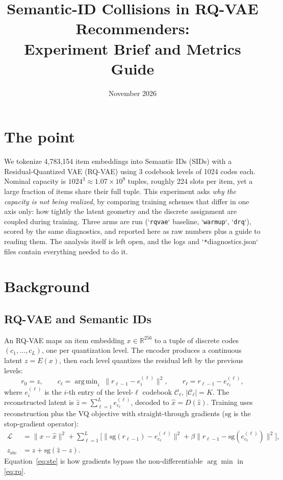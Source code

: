 \documentclass[11pt]{article}
\title{Semantic-ID Collisions in RQ-VAE Recommenders:\\ Experiment Brief and Metrics Guide}
\author{}
\date{November 2026}
\DeclareMathOperator{\argmin}{arg\,min}
\begin{document}
\maketitle

\section{The point}

We tokenize 4{,}783{,}154 item embeddings into Semantic IDs (SIDs) with a
Residual-Quantized VAE (RQ-VAE) using 3 codebook levels of 1024 codes each.
Nominal capacity is $1024^3 \approx 1.07 \times 10^9$ tuples, roughly 224 slots
per item, yet a large fraction of items share their full tuple. This experiment
asks \emph{why the capacity is not being realized}, by comparing training
schemes that differ in one axis only: how tightly the latent geometry and the
discrete assignment are coupled during training. Three arms are run
(`\texttt{rqvae}` baseline, `\texttt{warmup}`, `\texttt{drq}`), scored by the
same diagnostics, and reported here as raw numbers plus a guide to reading
them. The analysis itself is left open, and the logs and
`\texttt{*}\allowbreak diagnostics.json` files contain everything needed to do
it.

\section{Background}

\subsection{RQ-VAE and Semantic IDs}

An RQ-VAE maps an item embedding $x \in \mathbb{R}^{256}$ to a tuple of discrete
codes $(c_1,\dots,c_L)$, one per quantization level. The encoder produces a
continuous latent $z = E(x)$, then each level quantizes the residual left by the
previous levels:
\begin{equation}
  r_0 = z, \qquad
  c_\ell = \argmin_{i} \; \| r_{\ell-1} - e^{(\ell)}_i \|^2, \qquad
  r_\ell = r_{\ell-1} - e^{(\ell)}_{c_\ell},
  \label{eq:rq}
\end{equation}
where $e^{(\ell)}_i$ is the $i$-th entry of the level-$\ell$ codebook
$\mathcal{C}_\ell$, $|\mathcal{C}_\ell| = K$. The reconstructed latent is
$\hat{z} = \sum_{\ell=1}^{L} e^{(\ell)}_{c_\ell}$, decoded to $\hat{x} = D(\hat{z})$.
Training uses reconstruction plus the VQ objective with straight-through
gradients ($\mathrm{sg}$ is the stop-gradient operator):
\begin{align}
  \mathcal{L} &= \|x - \hat{x}\|^2
   + \sum_{\ell=1}^{L} \bigl[ \|\mathrm{sg}(r_{\ell-1}) - e^{(\ell)}_{c_\ell}\|^2
   + \beta \|r_{\ell-1} - \mathrm{sg}(e^{(\ell)}_{c_\ell})\|^2 \bigr],
  \label{eq:loss}\\
  z_{\mathrm{ste}} &= z + \mathrm{sg}(\hat{z} - z). \label{eq:ste}
\end{align}
Equation~\eqref{eq:ste} is how gradients bypass the non-differentiable
$\arg\min$ in \eqref{eq:rq}.
\end{document}
